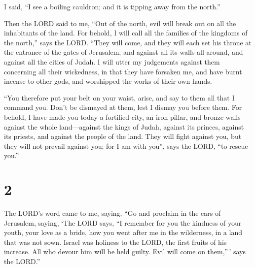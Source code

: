 I said, ``I see a boiling cauldron; and it is tipping away from the
north.''

 Then the LORD said to me, ``Out of the north, evil will
break out on all the inhabitants of the land.  For
behold, I will call all the families of the kingdoms of the north,''
says the LORD. ``They will come, and they will each set his throne at
the entrance of the gates of Jerusalem, and against all its walls all
around, and against all the cities of Judah.  I will
utter my judgements against them concerning all their wickedness, in
that they have forsaken me, and have burnt incense to other gods, and
worshipped the works of their own hands.

 ``You therefore put your belt on your waist, arise, and
say to them all that I command you. Don't be dismayed at them, lest I
dismay you before them.  For behold, I have made you
today a fortified city, an iron pillar, and bronze walls against the
whole land---against the kings of Judah, against its princes, against
its priests, and against the people of the land.  They
will fight against you, but they will not prevail against you; for I am
with you'', says the LORD, ``to rescue you.''

\hypertarget{section-1}{%
\section{2}\label{section-1}}

 The LORD's word came to me, saying,  ``Go
and proclaim in the ears of Jerusalem, saying, `The LORD says, ``I
remember for you the kindness of your youth, your love as a bride, how
you went after me in the wilderness, in a land that was not sown.
 Israel was holiness to the LORD, the first fruits of his
increase. All who devour him will be held guilty. Evil will come on
them,''\,' says the LORD.''

